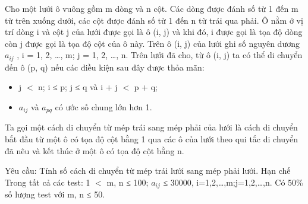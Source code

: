 Cho một lưới ô vuông gồm m dòng và n cột. Các dòng được đánh số từ 1 đến m từ trên xuống dưới, các cột được đánh số từ 1 đến n từ trái qua phải. Ô nằm ở vị trí dòng i và cột j của lưới được gọi là ô   (i, j) và khi đó, i được gọi là tọa độ dòng còn j được gọi là tọa độ cột của ô này. Trên ô (i, j) của lưới ghi số nguyên dương $a_{ij}$   , i = 1, 2, …, m; j = 1, 2, …, n. Trên lưới đã cho, từ ô (i, j) ta có thể   di chuyển đến ô (p, q) nếu các điều kiện sau đây được thỏa mãn:  
\begin{itemize}
	\item     j $<$ n; i ≤ p; j ≤ q và i + j $<$ p + q;   
	\item     $a_{ij}$    và $a_{pq}$    có ước số chung lớn hơn 1.   
\end{itemize}

   Ta gọi một cách di chuyển từ mép trái sang mép phải của lưới là cách di chuyển bắt đầu từ một ô có tọa độ cột bằng 1 qua các ô của lưới theo qui tắc di chuyển đã nêu và kết thúc ở một ô có tọa độ cột   bằng n.  

   Yêu cầu: Tính số cách di chuyển từ mép trái lưới sang mép phải lưới.
   Hạn chế  
Trong tất cả các test: 1 $<$ m, n ≤ 100; $a_{ij}$   ≤ 30000, i=1,2,…,m;j=1,2,…,n. Có 50\% số lượng test với m, n ≤ 50.